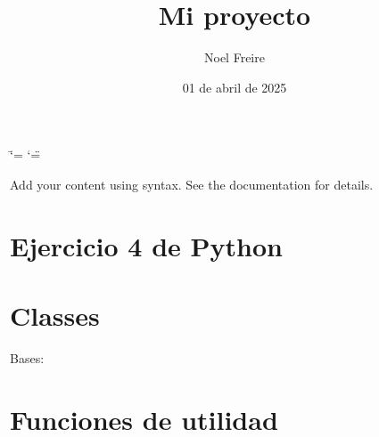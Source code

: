 \documentclass[letterpaper,10pt,spanish]{sphinxmanual}
\title{Mi proyecto}
\date{01 de abril de 2025}
\author{Noel Freire}
\begin{document}
\ifdefined\shorthandoff
  \ifnum\catcode`\=\string=\active\shorthandoff{=}\fi
  \ifnum\catcode`\"=\active{}\fi
\fi

\pagestyle{empty}
\sphinxmaketitle
\pagestyle{plain}
\sphinxtableofcontents
\pagestyle{normal}
\label{\detokenize{index::doc}}


\sphinxAtStartPar
Add your content using  syntax. See the
documentation for details.

\sphinxstepscope


\chapter{Ejercicio 4 de Python}
\label{\detokenize{app:ejercicio-4-de-python}}\label{\detokenize{app::doc}}\label{\detokenize{app:module-ejercicio}}
\sphinxstepscope


\chapter{Classes}
\label{\detokenize{classes:classes}}\label{\detokenize{classes::doc}}

\begin{fulllineitems}
\label{\detokenize{classes:clases.Variable}}
\pysigstartsignatures
\pysiglinewithargsret
{}
{\sphinxparamcomma {}\sphinxparamcomma {}\sphinxparamcomma {}\sphinxparamcomma {}}
{}
\pysigstopsignatures
\sphinxAtStartPar
Bases: {\hyperref[\detokenize{util:module-clases.Empleado}]{}}

\end{fulllineitems}


\sphinxstepscope


\chapter{Funciones de utilidad}
\label{\detokenize{util:funciones-de-utilidad}}\label{\detokenize{util::doc}}
\end{document}
